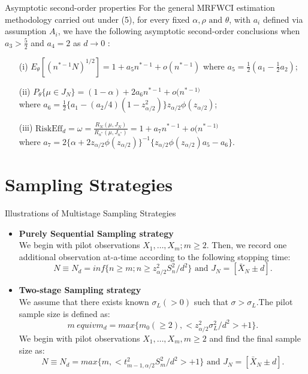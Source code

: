 \documentclass [xcolor=svgnames, t] {beamer}
\begin{document}
\begin{frame}{Asymptotic second-order properties}
\vspace{5mm}
For the general MRFWCI estimation methodology carried out under (5), for every fixed $\alpha, \rho \text{ and } \theta$, with $a_i$ defined via assumption $A_i$, we have the following asymptotic second-order conclusions when $a_3>\frac{5}{2}$ and $a_4=2$ as $d \xrightarrow{} 0$ :
\begin{enumerate}
\item[(i)] $E_{\theta}[(n^{*-1}N)^{1/2}]=1+a_5n^{*-1}+o(n^{*-1})$ where $a_5=\frac{1}{2}(a_1-\frac{1}{2}a_2)$;
\item[(ii)] $P_{\theta} \{ \mu \in J_N\} = (1-\alpha)+2a_6n^{*-1}+o(n^{*-1)}$\\
where $a_6=\frac{1}{2}\{ a_1-(a_2/4)(1-z^2_{\alpha/2}) \}z_{\alpha/2}\phi(z_{\alpha/2})$;
\item[(iii)] $\text{RiskEff}_d =\omega=\frac{R_N(\mu,J_N)}{R_{n^*}(\mu,J_{n^*})}= 1+ a_7 n^{*-1}+o(n^{*-1)}$ \\ where $a_7 = 2\{\alpha + 2z_{\alpha/2}\phi(z_{\alpha/2})\}^{-1} \{z_{\alpha/2}\phi(z_{\alpha/2})a_5-a_6\}$.
\end{enumerate}
 
\end{frame}

\section{Sampling Strategies}
\begin{frame}{Illustrations of Multistage Sampling Strategies}
    \begin{itemize}
    \item \textbf{Purely Sequential Sampling strategy}
\\ We begin with pilot observations $X_1,\dots ,X_m; m\ge 2$. Then, we record one additional observation at-a-time according to the following stopping
time:
\begin{equation*}
    N \equiv N_d=inf\{ n \ge m; n \ge z^2_{\alpha/2}S_n^2/d^2 \}  \textrm{ and }  J_N=[\bar{X}_N \pm d].
\end{equation*}
\item \textbf{Two-stage Sampling strategy}
    \\ We assume that there exists known $\sigma_L(>0)$ such that $\sigma>\sigma_L$.The pilot sample size is defined as:
    $$m\ equiv m_d=max \{ m_0(\ge 2),<z^2_{\alpha/2}\sigma_L^2/d^2>+1\}.$$
    We begin with pilot observations $X_1,\dots ,X_m, m \ge 2$ and find the final sample size as:
    \begin{equation*}
    N \equiv N_d=max\{ m,< t^2_{m-1,\alpha/2}S_m^2/d^2>+1\} \text{ and } J_N=[\bar{X}_N \pm d].
\end{equation*}
    \end{itemize}
\end{frame}
\end{document}
